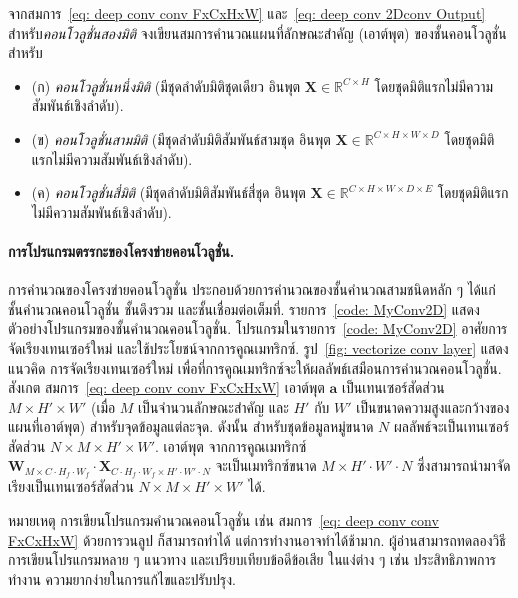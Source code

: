 \begin{Exercise}

จากสมการ~\ref{eq: deep conv conv FxCxHxW} และ~\ref{eq: deep conv 2Dconv Output} สำหรับ\textit{คอนโวลูชั่นสองมิติ}
จงเขียนสมการคำนวณแผนที่ลักษณะสำคัญ (เอาต์พุต) ของชั้นคอนโวลูชั่น
สำหรับ 
\begin{itemize}
	\item (ก) \textit{คอนโวลูชั่นหนึ่งมิติ} (มีชุดลำดับมิติชุดเดียว 
	อินพุต $\bm{X} \in \mathbb{R}^{C \times H}$ โดยชุดมิติแรกไม่มีความสัมพันธ์เชิงลำดับ).
	\item (ข) \textit{คอนโวลูชั่นสามมิติ} (มีชุดลำดับมิติสัมพันธ์สามชุด
	อินพุต $\bm{X} \in \mathbb{R}^{C \times H \times W \times D}$ โดยชุดมิติแรกไม่มีความสัมพันธ์เชิงลำดับ).
	\item (ค) \textit{คอนโวลูชั่นสี่มิติ} (มีชุดลำดับมิติสัมพันธ์สี่ชุด
	อินพุต $\bm{X} \in \mathbb{R}^{C \times H \times W \times D \times E}$ โดยชุดมิติแรกไม่มีความสัมพันธ์เชิงลำดับ).
\end{itemize}

\end{Exercise}

\paragraph{การโปรแกรมตรรกะของโครงข่ายคอนโวลูชั่น.}
การคำนวณของโครงข่ายคอนโวลูชั่น ประกอบด้วยการคำนวณของชั้นคำนวณสามชนิดหลัก ๆ ได้แก่ ชั้นคำนวณคอนโวลูชั่น ชั้นดึงรวม และชั้นเชื่อมต่อเต็มที่.
รายการ~\ref{code: MyConv2D} แสดงตัวอย่างโปรแกรมของชั้นคำนวณคอนโวลูชั่น.
โปรแกรมในรายการ~\ref{code: MyConv2D} อาศัยการจัดเรียงเทนเซอร์ใหม่ และใช้ประโยชน์จากการคูณเมทริกซ์.
รูป~\ref{fig: vectorize conv layer}
แสดงแนวคิด การจัดเรียงเทนเซอร์ใหม่
เพื่อที่การคูณเมทริกซ์จะให้ผลลัพธ์เสมือนการคำนวณคอนโวลูชั่น.
สังเกต สมการ~\ref{eq: deep conv conv FxCxHxW} เอาต์พุต $\bm{a}$ เป็นเทนเซอร์สัดส่วน $M \times H' \times W'$ 
(เมื่อ $M$ เป็นจำนวนลักษณะสำคัญ และ $H'$ กับ $W'$ เป็นขนาดความสูงและกว้างของแผนที่เอาต์พุต)
สำหรับจุดข้อมูลแต่ละจุด.
ดังนั้น สำหรับชุดข้อมูลหมู่ขนาด $N$ ผลลัพธ์จะเป็นเทนเซอร์สัดส่วน $N \times M \times H' \times W'$.
เอาต์พุต จากการคูณเมทริกซ์ $\bm{W}_{M \times C \cdot H_f \cdot W_f} \cdot \bm{X}_{C \cdot H_f \cdot W_f \times H' \cdot W' \cdot N}$
จะเป็นเมทริกซ์ขนาด $M \times H' \cdot W' \cdot N$ ซึ่งสามารถนำมาจัดเรียงเป็นเทนเซอร์สัดส่วน $N \times M \times H' \times W'$ ได้.

หมายเหตุ การเขียนโปรแกรมคำนวณคอนโวลูชั่น เช่น สมการ~\ref{eq: deep conv conv FxCxHxW}
ด้วยการวนลูป ก็สามารถทำได้ แต่การทำงานอาจทำได้ช้ามาก.
ผู้อ่านสามารถทดลองวิธีการเขียนโปรแกรมหลาย ๆ แนวทาง และเปรียบเทียบข้อดีข้อเสีย
ในแง่ต่าง ๆ เช่น ประสิทธิภาพการทำงาน  ความยากง่ายในการแก้ไขและปรับปรุง.

